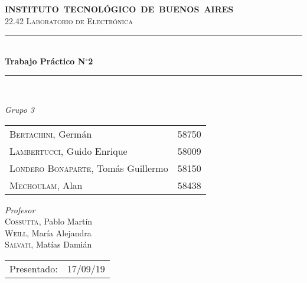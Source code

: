 \begin{titlepage}

\newcommand{\HRule}{\rule{\linewidth}{0.5mm}}
\center
\mbox{\textsc{\large \bfseries {INSTITUTO TECNOLÓGICO DE BUENOS AIRES}}}\\[1cm]
\textsc{\Large 22.42 Laboratorio de Electrónica}\\[0.5cm]


\HRule \\[0.6cm]
{ \Huge \bfseries Trabajo Práctico N$^{\circ}$2}\\[0.4cm] 
\HRule \\[1.5cm]


{\large

\emph{Grupo 3}\\
\vspace{3px}

\begin{tabular}{lr} 	
\textsc{Bertachini}, Germán  & 58750 \\ 	
\textsc{Lambertucci}, Guido Enrique  & 58009 \\
\textsc{Londero Bonaparte}, Tomás Guillermo  & 58150 \\
\textsc{Mechoulam}, Alan  &  58438\\
\end{tabular}

\vspace{20px}

\emph{Profesor}\\
\vspace{3px}
\textsc{Cossutta}, Pablo Martín\\
\textsc{Weill}, María Alejandra\\ 
\textsc{Salvati}, Matías Damián\\

\vspace{100px}

\begin{tabular}{ll}

Presentado: & 17/09/19\\

\end{tabular}

}

\vfill

\end{titlepage}

